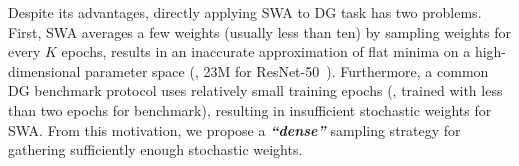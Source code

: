 


Despite its advantages, directly applying SWA to DG task has two problems.
First, SWA averages a few weights (usually less than ten) by sampling weights for every $K$ epochs, results in an inaccurate approximation of flat minima on a high-dimensional parameter space (\eg, 23M for ResNet-50~\cite{he2016_cvpr_resnet}).
Furthermore, a common DG benchmark protocol uses relatively small training epochs (\eg,
\citet{gulrajani2020domainbed} trained with less than two epochs for  benchmark), resulting in insufficient stochastic weights for SWA.
From this motivation, we propose a \textbf{\textit{``dense''}} sampling strategy for gathering sufficiently enough stochastic weights.

